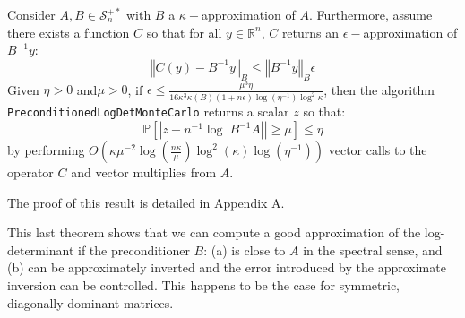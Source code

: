 \begin{theorem}\label{thm:preconditioning-approx}Consider $A,B\in\mathcal{S}_{n}^{+*}$
with $B$ a $\kappa-$approximation of $A$. Furthermore, assume there
exists a function $C$ so that for all $y\in\mathbb{R}^{n}$, $C$
returns an $\epsilon-$approximation of $B^{-1}y$:
\[
\left\Vert C\left(y\right)-B^{-1}y\right\Vert _{B}\leq\left\Vert B^{-1}y\right\Vert _{B}\epsilon
\]
Given $\eta>0$ and$\mu>0$, if $\epsilon\leq\frac{\mu^{3}\eta}{16\kappa^{3}\kappa\left(B\right)\left(1+n\epsilon\right)\log\left(\eta^{-1}\right)\log^{2}\kappa}$,
then the algorithm \texttt{PreconditionedLogDetMonteCarlo} returns
a scalar $z$ so that:
\[
\mathbb{P}\left[\left|z-n^{-1}\log\left|B^{-1}A\right|\right|\geq\mu\right]\leq\eta
\]
by performing $O\left(\kappa\mu^{-2}\log\left(\frac{n\kappa}{\mu}\right)\log^{2}\left(\kappa\right)\log\left(\eta^{-1}\right)\right)$
vector calls to the operator $C$ and vector multiplies from $A$. 

\end{theorem}

The proof of this result is detailed in Appendix A.

This last theorem shows that we can compute a good approximation of
the log-determinant if the preconditioner $B$: (a) is close to $A$
in the spectral sense, and (b) can be approximately inverted and the
error introduced by the approximate inversion can be controlled. This
happens to be the case for symmetric, diagonally dominant matrices.

